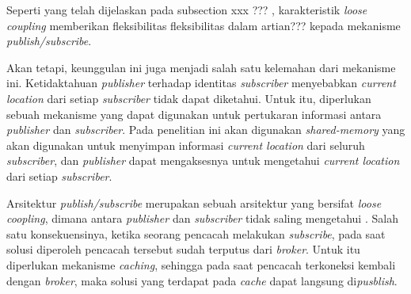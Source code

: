 Seperti yang telah dijelaskan pada \color{red} subsection xxx ??? \color{black}, karakteristik  \textit{loose coupling} memberikan fleksibilitas \color{red} fleksibilitas dalam artian??? \color{black} kepada mekanisme \textit{publish/subscribe}.  

Akan tetapi, keunggulan ini juga menjadi salah satu kelemahan dari mekanisme ini. Ketidaktahuan \textit{publisher} terhadap identitas \textit{subscriber} menyebabkan \textit{current location} dari setiap \textit{subscriber} tidak dapat diketahui. Untuk itu, diperlukan sebuah mekanisme yang dapat digunakan untuk pertukaran informasi antara \textit{publisher} dan \textit{subscriber}. Pada penelitian ini akan digunakan \textit{shared-memory} yang akan digunakan untuk menyimpan informasi \textit{current location} dari seluruh \textit{subscriber}, dan \textit{publisher} dapat mengaksesnya untuk mengetahui \textit{current location} dari setiap \textit{subscriber}.


Arsitektur \textit{publish/subscribe} merupakan sebuah arsitektur yang bersifat \textit{loose coopling}, dimana antara \textit{publisher} dan \textit{subscriber} tidak saling mengetahui \citep{muhl_large-scale_2002}. Salah satu konsekuensinya, ketika seorang pencacah melakukan \textit{subscribe}, pada saat solusi diperoleh pencacah tersebut sudah terputus dari \textit{broker}. Untuk itu diperlukan mekanisme \textit{caching}, sehingga pada saat pencacah terkoneksi kembali dengan \textit{broker}, maka solusi yang terdapat pada \textit{cache} dapat langsung di\textit{pusblish}.


%
%


